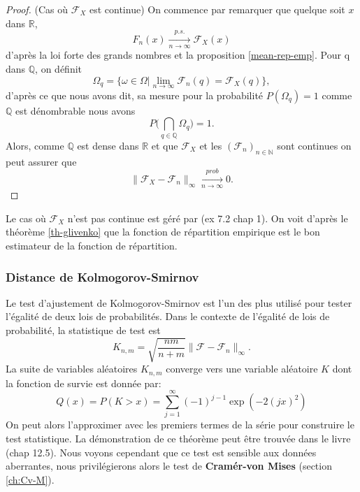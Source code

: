 \documentclass[a4paper,11pt]{article}
\begin{document}
\begin{proof} (Cas où $\mathcal{F}_X$ est continue)
	On commence par remarquer que quelque soit $x$ dans $\mathbb{R}$, \[F_{n}(x)\xrightarrow[n\to \infty]{p.s.}\mathcal{F}_X(x)\] d'après la loi forte des grands nombres et la proposition \eqref{mean-rep-emp}. Pour q dans $\mathbb{Q}$, on définit 
	\[\Omega_{q}=\{\omega \in \Omega | \lim_{n \to \infty} \mathcal{F}_{n}(q)=\mathcal{F}_X(q)\},\]
	d'après ce que nous avons dit, sa mesure pour la probabilité $P(\Omega_q)=1$ comme $\mathbb{Q}$ est dénombrable nous avons  
	\[P\Big(\bigcap_{q \in \mathbb{Q}} \Omega_q \Big)=1.\]
	Alors, comme $\mathbb{Q}$ est dense dans $\mathbb{R}$ et que $\mathcal{F}_{X}$ et les $(\mathcal{F}_n)_{n \in \mathbb{N}}$ sont continues on peut assurer que   
	\[	\|\mathcal{F}_{X}-\mathcal{F}_{n}\|_{\infty} \xrightarrow[n\to \infty]{prob} 0. \]
\end{proof}
Le cas où $\mathcal{F}_{X}$ n'est pas continue est géré par \cite{durrett2019probability} (ex 7.2 chap 1). On voit d'après le théorème \ref{th-glivenko} que la fonction de répartition empirique est le bon estimateur de la fonction de répartition. 
\subsubsection{Distance de Kolmogorov-Smirnov}

Le test d'ajustement  de  Kolmogorov-Smirnov \cite{buning2002robustness} est  l'un des plus  utilisé pour tester l'égalité de deux lois  de probabilités. Dans  le  contexte de  l'égalité de lois  de probabilité, la statistique  de  test  est 
\[K_{n,m}= \sqrt{\frac{nm}{n+m}}\|\mathcal{F}-\mathcal{F}_n\|_{\infty}.\]
La suite de variables aléatoires $K_{n,m}$ converge vers une variable aléatoire $K$ dont la fonction de survie est donnée par: 
\begin{equation}
	Q(x)=P(K>x)=\sum_{j=1}^{\infty}(-1)^{j-1}\exp(-2(jx)^2)
\end{equation}
On peut alors l'approximer avec les premiers termes de la série pour construire le test statistique. La démonstration de ce théorème peut être trouvée dans le livre \cite{walker1965probability}(chap 12.5). Nous voyons cependant que ce test est sensible aux données aberrantes, nous privilégierons alors le test de \textbf{Cramér-von Mises} \cite{buning2002robustness} (section \ref{ch:Cv-M}).
\end{document}
